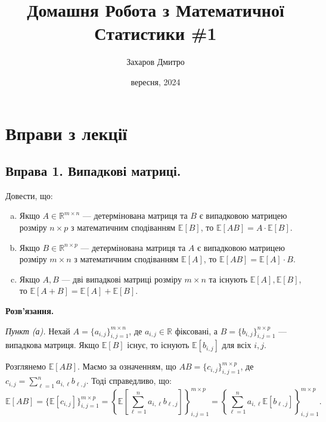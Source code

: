 \documentclass{hw_template}
\title{\huge\sffamily\bfseries Домашня Робота з Математичної Статистики \#1}
\author{\Large\sffamily Захаров Дмитро}
\date{\sffamily 8 вересня, 2024}
\begin{document}
\pagestyle{fancy}

\maketitle

\tableofcontents

\pagebreak

\section{Вправи з лекції}

\subsection{Вправа 1. Випадкові матриці.}
\begin{problem}
    Довести, що:
    \begin{enumerate}[(a)]
        \item Якщо $A \in \mathbb{R}^{m \times n}$ --- детермінована матриця та $B$ є випадковою матрицею розміру $n \times p$ з математичним сподіванням $\mathbb{E}[B]$, то $\mathbb{E}[AB] = A\cdot\mathbb{E}[B]$.
        \item Якщо $B \in \mathbb{R}^{n \times p}$ --- детермінована матриця та $A$ є випадковою матрицею розміру $m \times n$ з математичним сподіванням $\mathbb{E}[A]$, то $\mathbb{E}[AB] = \mathbb{E}[A]\cdot B$.
        \item Якщо $A,B$ --- дві випадкові матриці розміру $m \times n$ та існують $\mathbb{E}[A],\mathbb{E}[B]$, то $\mathbb{E}[A+B]=\mathbb{E}[A]+\mathbb{E}[B]$.
    \end{enumerate}
\end{problem}

\textbf{Розв'язання.} 

\textit{Пункт (а).} Нехай $A = \{a_{i,j}\}_{i,j=1}^{m \times n}$, де $a_{i,j} \in \mathbb{R}$ фіксовані, а $B=\{b_{i,j}\}_{i,j=1}^{n \times p}$ --- випадкова матриця. Якщо $\mathbb{E}[B]$ існує, то існують $\mathbb{E}[b_{i,j}]$ для всіх $i,j$. 

Розглянемо $\mathbb{E}[AB]$. Маємо за означенням, що $AB=\{c_{i,j}\}_{i,j=1}^{m \times p}$, де $c_{i,j} = \sum_{\ell=1}^{n} a_{i,\ell}b_{\ell,j}$. Тоді справедливо, що:
\begin{equation*}
    \mathbb{E}[AB] = \{\mathbb{E}[c_{i,j}]\}_{i,j=1}^{m \times p} = \left\{\mathbb{E}\left[\sum_{\ell=1}^{n} a_{i,\ell}b_{\ell,j}\right]\right\}_{i,j=1}^{m \times p} = \left\{\sum_{\ell=1}^{n} a_{i,\ell}\mathbb{E}[b_{\ell,j}]\right\}_{i,j=1}^{m \times p}.
\end{equation*}
\end{document}
